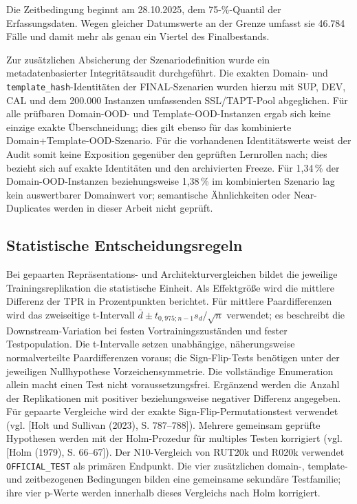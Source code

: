 Die Zeitbedingung beginnt am 28.10.2025, dem 75-\%-Quantil der Erfassungsdaten.
Wegen gleicher Datumswerte an der Grenze umfasst sie 46.784 Fälle und damit mehr als
genau ein Viertel des Finalbestands.

Zur zusätzlichen Absicherung der Szenariodefinition wurde ein metadatenbasierter
Integritätsaudit durchgeführt. Die exakten Domain- und \nolinkurl{template_hash}-Identitäten der
FINAL-Szenarien wurden hierzu mit SUP, DEV, CAL und dem 200.000 Instanzen umfassenden
SSL/TAPT-Pool abgeglichen. Für alle prüfbaren Domain-OOD- und Template-OOD-Instanzen
ergab sich keine einzige exakte Überschneidung; dies gilt ebenso für das kombinierte
Domain+Template-OOD-Szenario. Für die vorhandenen Identitätswerte weist der Audit somit keine Exposition gegenüber den
geprüften Lernrollen nach; dies bezieht sich auf exakte Identitäten und den archivierten Freeze. Für 1,34\,\% der Domain-OOD-Instanzen beziehungsweise 1,38\,\% im
kombinierten Szenario lag kein auswertbarer Domainwert vor; semantische Ähnlichkeiten oder
Near-Duplicates werden in dieser Arbeit nicht geprüft.

\subsection{Statistische Entscheidungsregeln}

Bei gepaarten Repräsentations- und Architekturvergleichen bildet die jeweilige
Trainingsreplikation die statistische Einheit. Als Effektgröße wird die mittlere Differenz der TPR
in Prozentpunkten berichtet. Für mittlere Paardifferenzen wird das zweiseitige t-Intervall
$\bar d\pm t_{0{,}975;n-1}s_d/\sqrt n$ verwendet; es beschreibt die
Downstream-Variation bei festen Vortrainingszuständen und fester Testpopulation.
Die t-Intervalle setzen unabhängige, näherungsweise normalverteilte Paardifferenzen voraus;
die Sign-Flip-Tests benötigen unter der jeweiligen Nullhypothese Vorzeichensymmetrie.
Die vollständige Enumeration allein macht einen Test nicht voraussetzungsfrei.
Ergänzend werden die Anzahl der
Replikationen mit positiver beziehungsweise negativer Differenz angegeben. Für gepaarte
Vergleiche wird der exakte Sign-Flip-Permutationstest verwendet (vgl. [Holt und Sullivan (2023), S. 787--788]). Mehrere gemeinsam geprüfte Hypothesen werden mit der Holm-Prozedur für
multiples Testen korrigiert (vgl. [Holm (1979), S. 66--67]). Der N10-Vergleich von RUT20k und R020k verwendet \nolinkurl{OFFICIAL_TEST} als primären
Endpunkt. Die vier zusätzlichen domain-, template- und zeitbezogenen Bedingungen bilden eine
gemeinsame sekundäre Testfamilie; ihre vier p-Werte werden innerhalb dieses Vergleichs nach
Holm korrigiert.

